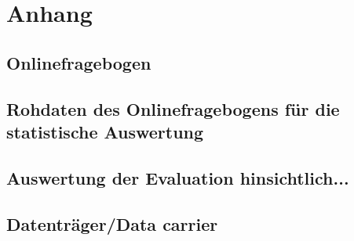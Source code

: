 
\appendix
\section{Anhang}

\subsection[]{Onlinefragebogen} \label{sec:a1} 
%

\subsection[]{Rohdaten des Onlinefragebogens für die statistische Auswertung}

\subsection[]{Auswertung der Evaluation hinsichtlich...}

\subsection[]{Datenträger/Data carrier}
